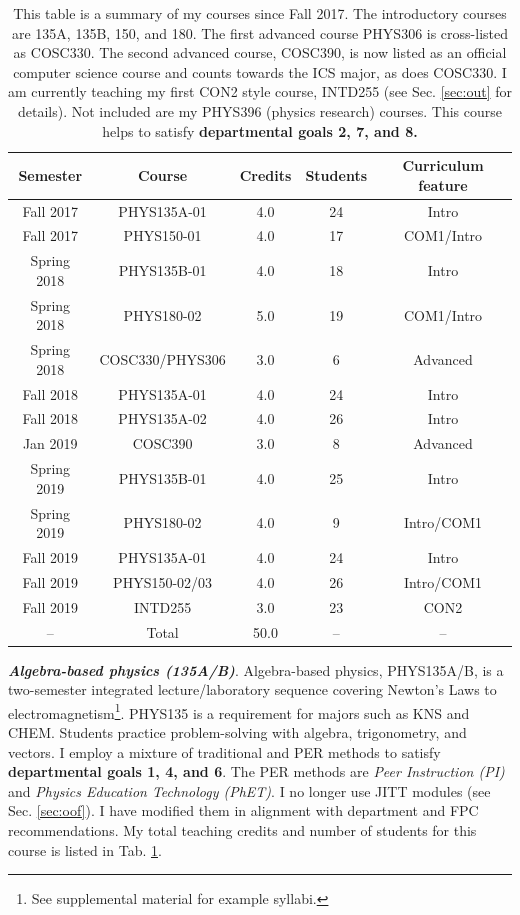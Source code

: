 \documentclass[../../../main.tex]{subfiles}
\begin{document}
\label{sec:courseDesc}

\begin{table}
\centering
\begin{tabular}{| c | c | c | c | c |}
\hline \hline
Semester & Course & Credits & Students & Curriculum feature \\ \hline
Fall 2017 & PHYS135A-01 & 4.0 & 24 & Intro \\ \hline
Fall 2017 & PHYS150-01 & 4.0 & 17 & COM1/Intro \\ \hline
Spring 2018 & PHYS135B-01 & 4.0 & 18 & Intro \\ \hline
Spring 2018 & PHYS180-02 & 5.0 & 19 & COM1/Intro \\ \hline
Spring 2018 & COSC330/PHYS306 & 3.0 & 6 & Advanced \\ \hline
Fall 2018 & PHYS135A-01 & 4.0 & 24 & Intro \\ \hline
Fall 2018 & PHYS135A-02 & 4.0 & 26 & Intro \\ \hline
Jan 2019 & COSC390 & 3.0 & 8 & Advanced \\ \hline
Spring 2019 & PHYS135B-01 & 4.0 & 25 & Intro \\ \hline
Spring 2019 & PHYS180-02 & 4.0 & 9 & Intro/COM1 \\ \hline
Fall 2019 & PHYS135A-01 & 4.0 & 24 & Intro \\ \hline
Fall 2019 & PHYS150-02/03 & 4.0 & 26 & Intro/COM1 \\ \hline
Fall 2019 & INTD255 & 3.0 & 23 & CON2 \\ \hline
-- & Total & 50.0 & -- & -- \\ \hline
\hline
\end{tabular}
\caption{\label{tab:courses:teaching} This table is a summary of my courses since Fall 2017.  The introductory courses are 135A, 135B, 150, and 180.  The first advanced course PHYS306 is cross-listed as COSC330. The second advanced course, COSC390, is now listed as an official computer science course and counts towards the ICS major, as does COSC330.  I am currently teaching my first CON2 style course, INTD255 (see Sec. \ref{sec:out} for details). Not included are my PHYS396 (physics research) courses.  This course helps to satisfy \textbf{departmental goals 2, 7, and 8.}}
\end{table}

\textbf{\textit{Algebra-based physics (135A/B)}}. Algebra-based physics, PHYS135A/B, is a two-semester integrated lecture/laboratory sequence covering Newton's Laws to electromagnetism\footnote{See supplemental material for example syllabi.}.  PHYS135 is a requirement for majors such as KNS and CHEM.  Students practice problem-solving with algebra, trigonometry, and vectors.  I employ a mixture of traditional and PER methods to satisfy \textbf{departmental goals 1, 4, and 6}.  The PER methods are \textit{Peer Instruction (PI)} and \textit{Physics Education Technology (PhET)}.  I no longer use JITT modules (see Sec. \ref{sec:oof}).  I have modified them in alignment with department and FPC recommendations.  My total teaching credits and number of students for this course is listed in Tab. \ref{tab:courses:teaching}.  \\ \hspace{0.1cm}
\end{document}
